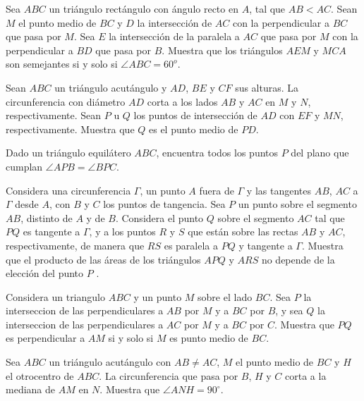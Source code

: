 \documentclass[11pt]{scrartcl}
\begin{document}
\begin{problem} [2006/2] 
    Sea $ABC$ un triángulo rectángulo con ángulo recto en $A$, tal que $AB < AC$. Sean $M$ el punto medio de $BC$ y $D$ la intersección de $AC$ con la perpendicular a $BC$ que pasa por $M$. Sea $E$ la intersección de la paralela a $AC$ que pasa por $M$ con la perpendicular a $BD$ que pasa por $B$. Muestra que los triángulos $AEM$ y $MCA$ son semejantes si y solo si $\angle ABC=60^o$.
    \end{problem}
\begin{problem} [2006/5] 
    Sean $ABC$ un triángulo acutángulo y $AD$, $BE$ y $CF$ sus alturas. La circunferencia con diámetro $AD$ corta a los lados $AB$ y $AC$ en $M$ y $N$, respectivamente. Sean $P$ u $Q$ los puntos de intersección de $AD$ con $EF$ y $MN$, respectivamente. Muestra que $Q$ es el punto medio de $PD$.
    \end{problem}
\begin{problem} [2007/2] 
    Dado un triángulo equilátero $ABC$, encuentra todos los puntos $P$ del plano que cumplan $\angle APB=\angle BPC$.
    \end{problem}

 \begin{problem} [2008/2] 
    Considera una circunferencia $\Gamma$, un punto $A$ fuera de $\Gamma$ y las tangentes $AB$, $AC$ a $\Gamma$ desde
$A$, con $B$ y $C$ los puntos de tangencia. Sea $P$ un punto sobre el segmento $AB$, distinto de
$A$ y de $B$. Considera el punto $Q$ sobre el segmento $AC$ tal que $P Q$ es tangente a $\Gamma$, y a los
puntos $R$ y $S$ que están sobre las rectas $AB$ y $AC$, respectivamente, de manera que $RS$
es paralela a $P Q$ y tangente a $\Gamma$. Muestra que el producto de las áreas de los triángulos
$APQ$ y $ARS$ no depende de la elección del punto $P$ .
    \end{problem}
 
\begin{problem}
[2009/5] Considera un triangulo $ABC$ y un punto $M$ sobre el lado $BC$. Sea $P$ la interseccion de las perpendiculares a $AB$ por $M$ y a $BC$ por $B$, y sea $Q$ la interseccion de las perpendiculares a $AC$ por $M$ y a $BC$ por $C$. Muestra que $PQ$ es perpendicular a $AM$ si y solo si $M$ es punto medio de $BC$. 
\end{problem}

\begin{problem}
[2010/5]Sea $ABC$ un triángulo acutángulo con $AB \neq AC$, $M$ el punto medio de $BC$ y $H$ el otrocentro de $ABC$. La circunferencia que pasa por $B$, $H$ y $C$ corta a la mediana de $AM$ en $N$. Muestra que $\angle ANH = 90^{\circ}$.
\end{problem}
\end{document}
